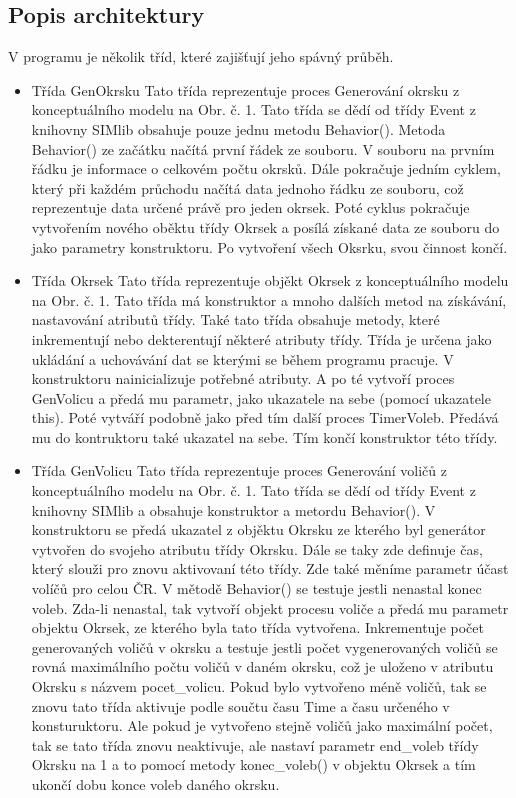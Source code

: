 \documentclass[12pt,a4paper,titlepage,final]{article}
\begin{document}
\subsection{Popis architektury}
V programu je několik tříd, které zajišťují jeho spávný průběh. 
 \begin{itemize}
\item Třída GenOkrsku
\subitem Tato třída reprezentuje proces Generování okrsku z konceptuálního modelu na Obr. č. 1. Tato třída se dědí od třídy Event z knihovny SIMlib obsahuje pouze jednu metodu Behavior(). Metoda Behavior() ze začátku načítá první řádek ze souboru. V souboru na prvním řádku je informace o celkovém počtu okrsků. Dále pokračuje jedním cyklem, který při každém průchodu načítá data jednoho řádku ze souboru, což reprezentuje data určené právě pro jeden okrsek. Poté cyklus pokračuje vytvořením nového oběktu třídy Okrsek a posílá získané data ze souboru do jako parametry konstruktoru. Po vytvoření všech Oksrku, svou činnost končí.

\item Třída Okrsek
\subitem Tato třída reprezentuje objěkt Okrsek z konceptuálního modelu na Obr. č. 1. Tato třída má konstruktor a mnoho dalších metod na získávání, nastavování atributů třídy. Také tato třída obsahuje metody, které inkrementují nebo dekterentují některé atributy třídy. Třída je určena jako ukládání a uchovávání dat se kterými se během programu pracuje. V konstruktoru nainicializuje potřebné atributy. A po té vytvoří proces GenVolicu a předá mu parametr, jako ukazatele na sebe (pomocí ukazatele this). Poté vytváří podobně jako před tím další proces TimerVoleb. Předává mu do kontruktoru také ukazatel na sebe. Tím končí konstruktor této třídy.

\item Třída GenVolicu
\subitem Tato třída reprezentuje proces Generování voličů z konceptuálního modelu na Obr. č. 1. Tato třída se dědí od třídy Event z knihovny SIMlib a obsahuje konstruktor a metordu Behavior(). V konstruktoru se předá ukazatel z objěktu Okrsku ze kterého byl generátor vytvořen do svojeho atributu třídy Okrsku. Dále se taky zde definuje čas, který slouži pro znovu aktivovaní této třídy. Zde také měníme parametr účast volíčů pro celou ČR. V mětodě Behavior() se testuje jestli nenastal konec voleb. Zda-li nenastal, tak vytvoří objekt procesu voliče a předá mu parametr objektu Okrsek, ze kterého byla tato třída vytvořena. Inkrementuje počet generovaných voličů v okrsku a testuje jestli počet vygenerovaných voličů se rovná maximálního počtu voličů v daném okrsku, což je uloženo v atributu Okrsku s názvem pocet\_volicu. Pokud bylo vytvořeno méně voličů, tak se znovu tato třída aktivuje podle součtu času Time a času určeného v konsturuktoru. Ale pokud je vytvořeno stejně voličů jako maximální počet, tak se tato třída znovu neaktivuje, ale nastaví parametr end\_voleb třídy Okrsku na 1 a to pomocí metody konec\_voleb() v objektu Okrsek a tím ukončí dobu konce voleb daného okrsku. 


\end{itemize}
\end{document}
